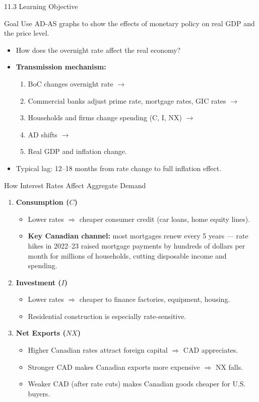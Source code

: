 \documentclass[aspectratio=169]{beamer}
\begin{document}
\begin{frame}{11.3 Learning Objective}
\transfade
\begin{block}{Goal}
Use AD-AS graphs to show the effects of monetary policy on real GDP and the price level.
\end{block}
\begin{itemize}[<+->]
  \item How does the overnight rate affect the real economy?
  \item \textbf{Transmission mechanism:}
  \begin{enumerate}[<+->]
    \item BoC changes overnight rate $\rightarrow$
    \item Commercial banks adjust prime rate, mortgage rates, GIC rates $\rightarrow$
    \item Households and firms change spending (C, I, NX) $\rightarrow$
    \item AD shifts $\rightarrow$
    \item Real GDP and inflation change.
  \end{enumerate}
  \item Typical lag: \alert{12--18 months} from rate change to full inflation effect.
\end{itemize}
\end{frame}

\begin{frame}{How Interest Rates Affect Aggregate Demand}
\transfade
\begin{enumerate}[<+->]
  \item \textbf{Consumption ($C$)}
  \begin{itemize}[<+->]
    \item Lower rates $\Rightarrow$ cheaper consumer credit (car loans, home equity lines).
    \item \textbf{Key Canadian channel:} most mortgages renew every 5 years --- rate hikes in 2022--23 raised mortgage payments by hundreds of dollars per month for millions of households, cutting disposable income and spending.
  \end{itemize}
  \item \textbf{Investment ($I$)}
  \begin{itemize}[<+->]
    \item Lower rates $\Rightarrow$ cheaper to finance factories, equipment, housing.
    \item Residential construction is especially rate-sensitive.
  \end{itemize}
  \item \textbf{Net Exports ($NX$)}
  \begin{itemize}[<+->]
    \item Higher Canadian rates attract foreign capital $\Rightarrow$ CAD appreciates.
    \item Stronger CAD makes Canadian exports more expensive $\Rightarrow$ NX falls.
    \item Weaker CAD (after rate cuts) makes Canadian goods cheaper for U.S. buyers.
  \end{itemize}
\end{enumerate}
\end{frame}
\end{document}

